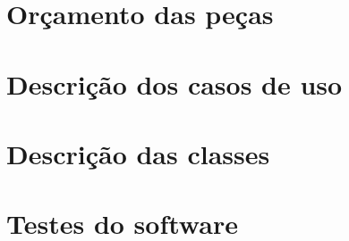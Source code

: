 \apendices
\chapter{Orçamento das peças}


\chapter{Descrição dos casos de uso}
\label{apendice_caso_uso}


\chapter{Descrição das classes}
\label{apendice_classes}


\chapter{Testes do software}
\label{apendice_software_tests}


